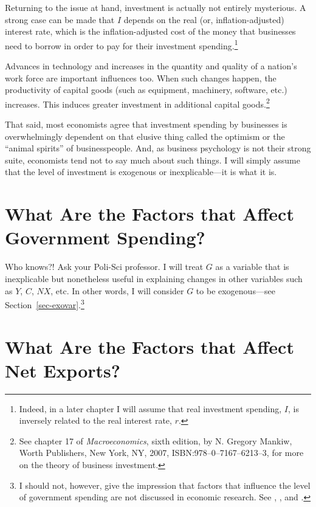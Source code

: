 \documentclass[
  letterpaper,
]{book}
\theoremstyle{plain}
\theoremstyle{remark}
\begin{document}
Returning to the issue at hand, investment is actually not entirely
mysterious. A strong case can be made that \(I\) depends on the real
(or, inflation-adjusted) interest rate, which is the inflation-adjusted
cost of the money that businesses need to borrow in order to pay for
their investment spending.\footnote{Indeed, in a later chapter I will
  assume that real investment spending, \(I\), is inversely related to
  the real interest rate, \(r\).}

Advances in technology and increases in the quantity and quality of a
nation's work force are important influences too. When such changes
happen, the productivity of capital goods (such as equipment, machinery,
software, etc.) increases. This induces greater investment in additional
capital goods.\footnote{See chapter 17 of \emph{Macroeconomics}, sixth
  edition, by N. Gregory Mankiw, Worth Publishers, New York, NY, 2007,
  ISBN:978--0--7167--6213--3, for more on the theory of business
  investment.}

That said, most economists agree that investment spending by businesses
is overwhelmingly dependent on that elusive thing called the optimism or
the ``animal spirits'' of businesspeople. And, as business psychology is
not their strong suite, economists tend not to say much about such
things. I will simply assume that the level of investment is exogenous
or inexplicable---it is what it is.

\section{What Are the Factors that Affect Government
Spending?}\label{sec-gov}

Who knows?! Ask your Poli-Sci professor. I will treat \(G\) as a
variable that is inexplicable but nonetheless useful in explaining
changes in other variables such as \(Y\), \(C\), \(NX\), etc. In other
words, I will consider \(G\) to be exogenous---see
Section~\ref{sec-exovar}.\footnote{I should not, however, give the
  impression that factors that influence the level of government
  spending are not discussed in economic research. See
  \textcite{mueller2003public}, \textcite{persson2002political}, and
  \textcite{drazen2002political}.}

\section{What Are the Factors that Affect Net
Exports?}\label{sec-netexports}
\end{document}
